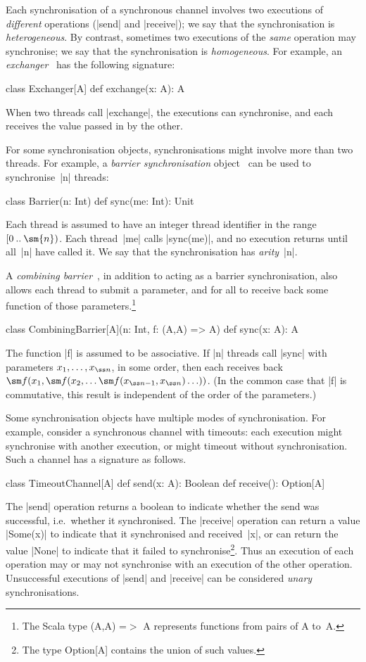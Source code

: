 Each synchronisation of a synchronous channel involves two executions of
\emph{different} operations (|send| and |receive|); we say that the
synchronisation is \emph{heterogeneous}.  By contrast, sometimes two
executions of the \emph{same} operation may synchronise; we say that the
synchronisation is \emph{homogeneous}.  For example, an
\emph{exchanger}~\cite{HSY2004,herlihy-shavit} has the following signature:
%
\begin{scala}
class Exchanger[A]{
  def exchange(x: A): A
}
\end{scala}
%
When two threads call |exchange|, the executions can synchronise, and each
receives the value passed in by the other.

For some synchronisation objects, synchronisations might involve more than two
threads.  For example, a \emph{barrier synchronisation}
object~\cite{andrews,JCSP} can be used to synchronise~|n| threads:
%
\begin{scala}
class Barrier(n: Int){
  def sync(me: Int): Unit
}
\end{scala}
%
Each thread is assumed to have an integer thread identifier in the range
$\range{0}{\sm{n}}$.  Each thread~|me| calls |sync(me)|, and no execution
returns until all~|n| have called it.  We say that the synchronisation has
\emph{arity}~|n|.

A \emph{combining barrier}~\cite{andrews}, in addition to acting as a barrier
synchronisation, also allows each thread to submit a parameter, and for all to
receive back some function of those parameters.\footnote{The Scala type
  {\scalashape (A,A) =}$>$ {\scalashape A} represents functions from pairs of
  {\scalashape A} to~{\scalashape A}.}
%
\begin{scala}
class CombiningBarrier[A](n: Int, f: (A,A) => A){
  def sync(x: A): A
}
\end{scala}
%
The function |f| is assumed to be associative.  If |n| threads call |sync|
with parameters $x_1, \ldots, x_{\ss n}$, in some order, then each receives
back $\sm f(x_1, \sm f(x_2, \ldots \sm f(x_{{\ss n}-1}, x_{\ss n}) \ldots ))$.
(In the common case that |f| is commutative, this result is independent of the
order of the parameters.)

Some synchronisation objects have multiple modes of synchronisation.  For
example, consider a synchronous channel with timeouts: each execution might
synchronise with another execution, or might timeout without
synchronisation.  Such a channel has a signature as follows.
%
\begin{scala}
class TimeoutChannel[A]{
  def send(x: A): Boolean
  def receive(): Option[A]
}
\end{scala}
%
The |send| operation returns a boolean to indicate whether the send was
successful, i.e.~whether it synchronised.  The |receive| operation can return
a value |Some(x)| to indicate that it synchronised and received~|x|, or can
return the value |None| to indicate that it failed to synchronise\footnote{The
  type {\scalashape Option[A]} contains the union of such values.}.  Thus an
execution of each operation may or may not synchronise with an execution of
the other operation.  Unsuccessful executions of |send| and |receive|
can be considered \emph{unary} synchronisations.  

